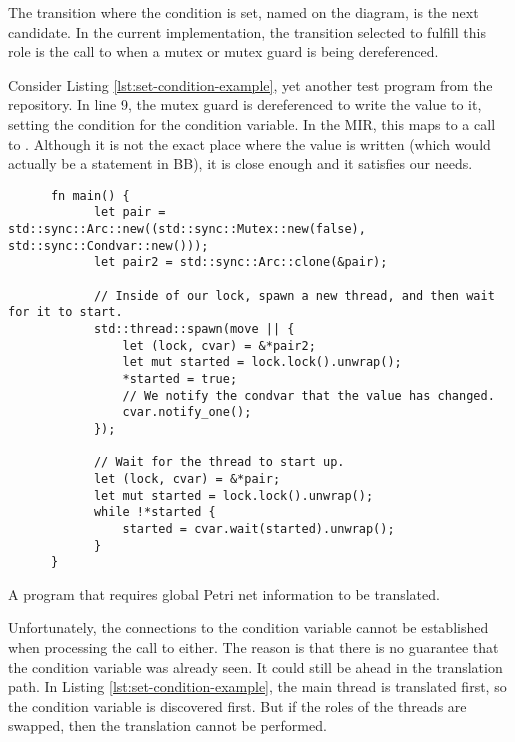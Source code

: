 The transition where the condition is set, named  on the diagram,
is the next candidate.
In the current implementation, the transition selected to fulfill this role
is the call to 
when a mutex or mutex guard is being dereferenced.

Consider Listing \ref{lst:set-condition-example},
yet another test program from the repository.
In line 9, the mutex guard is dereferenced to write the value  to it,
setting the condition for the condition variable.
In the \acrshort{MIR}, this maps to a call to .
Although it is not the exact place where the value is written
(which would actually be a statement in \acrshort{BB}),
it is close enough and it satisfies our needs.

\begin{listing}[!htbp]
      \begin{verbatim}
      fn main() {
            let pair = std::sync::Arc::new((std::sync::Mutex::new(false), std::sync::Condvar::new()));
            let pair2 = std::sync::Arc::clone(&pair);
        
            // Inside of our lock, spawn a new thread, and then wait for it to start.
            std::thread::spawn(move || {
                let (lock, cvar) = &*pair2;
                let mut started = lock.lock().unwrap();
                *started = true;
                // We notify the condvar that the value has changed.
                cvar.notify_one();
            });
        
            // Wait for the thread to start up.
            let (lock, cvar) = &*pair;
            let mut started = lock.lock().unwrap();
            while !*started {
                started = cvar.wait(started).unwrap();
            }
      }              
      \end{verbatim}
      \caption{A program that requires global Petri net information to be translated.}
      \label{lst:set-condition-example}
\end{listing}

Unfortunately, the connections to the condition variable cannot be established
when processing the call to  either.
The reason is that there is no guarantee that the condition variable was already seen.
It could still be ahead in the translation path.
In Listing \ref{lst:set-condition-example}, the main thread is translated first,
so the condition variable is discovered first.
But if the roles of the threads are swapped, then the translation cannot be performed.

